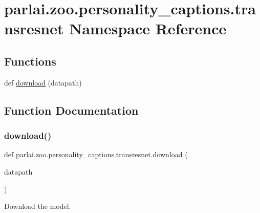 \hypertarget{namespaceparlai_1_1zoo_1_1personality__captions_1_1transresnet}{}\section{parlai.\+zoo.\+personality\+\_\+captions.\+transresnet Namespace Reference}
\label{namespaceparlai_1_1zoo_1_1personality__captions_1_1transresnet}
\subsection*{Functions}
\begin{DoxyCompactItemize}
\item 
def \hyperlink{namespaceparlai_1_1zoo_1_1personality__captions_1_1transresnet_a3bc7fd4d2fb757f3481c3dab3355ef12}{download} (datapath)
\end{DoxyCompactItemize}


\subsection{Function Documentation}
\mbox{\label{namespaceparlai_1_1zoo_1_1personality__captions_1_1transresnet_a3bc7fd4d2fb757f3481c3dab3355ef12}} 
\subsubsection{\texorpdfstring{download()}{download()}}
{\footnotesize\ttfamily def parlai.\+zoo.\+personality\+\_\+captions.\+transresnet.\+download (\begin{DoxyParamCaption}\item[{}]{datapath }\end{DoxyParamCaption})}

\begin{DoxyVerb}Download the model.
\end{DoxyVerb}
 